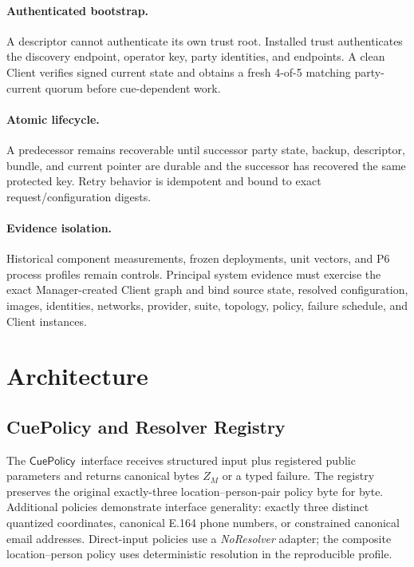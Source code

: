\documentclass[sigconf,anonymous]{acmart}
\newcommand{\CuePolicy}{\ensuremath{\mathsf{CuePolicy}}}
\begin{document}
\paragraph{Authenticated bootstrap.}
A descriptor cannot authenticate its own trust root. Installed trust
authenticates the discovery endpoint, operator key, party identities, and
endpoints. A clean Client verifies signed current state and obtains a fresh
4-of-5 matching party-current quorum before cue-dependent work.

\paragraph{Atomic lifecycle.}
A predecessor remains recoverable until successor party state, backup,
descriptor, bundle, and current pointer are durable and the successor has
recovered the same protected key. Retry behavior is idempotent and bound to
exact request/configuration digests.

\paragraph{Evidence isolation.}
Historical component measurements, frozen deployments, unit vectors, and
P6 process profiles remain controls. Principal system evidence must exercise
the exact Manager-created Client graph and bind source state, resolved
configuration, images, identities, networks, provider, suite, topology,
policy, failure schedule, and Client instances.

\section{Architecture}
\label{sec:architecture}

\subsection{CuePolicy and Resolver Registry}

The \CuePolicy\ interface receives structured input plus registered public
parameters and returns canonical bytes \(Z_M\) or a typed failure. The registry
preserves the original exactly-three location--person-pair policy byte for
byte. Additional policies demonstrate interface generality: exactly three
distinct quantized coordinates, canonical E.164 phone numbers, or constrained
canonical email addresses. Direct-input policies use a \emph{NoResolver}
adapter; the composite location--person policy uses deterministic resolution
in the reproducible profile.
\end{document}
